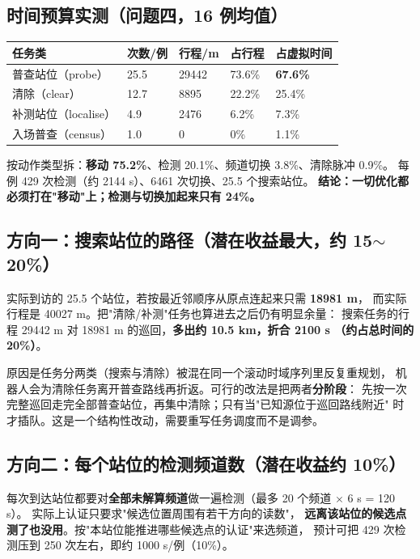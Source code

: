 \subsection{时间预算实测（问题四，16 例均值）}

\begin{center}
\small
\begin{tabular}{p{3.4cm}p{1.8cm}p{2.2cm}p{2.0cm}p{2.4cm}}
\toprule
任务类 & 次数/例 & 行程/m & 占行程 & 占虚拟时间 \\ \midrule
普查站位（probe） & 25.5 & 29442 & 73.6\% & \textbf{67.6\%} \\
清除（clear） & 12.7 & 8895 & 22.2\% & 25.4\% \\
补测站位（localise） & 4.9 & 2476 & 6.2\% & 7.3\% \\
入场普查（census） & 1.0 & 0 & 0\% & 1.1\% \\
\bottomrule
\end{tabular}
\end{center}

按动作类型拆：\textbf{移动 75.2\%}、检测 20.1\%、频道切换 3.8\%、清除脉冲 0.9\%。
每例 429 次检测（约 2144 s）、6461 次切换、25.5 个搜索站位。
\textbf{结论：一切优化都必须打在"移动"上；检测与切换加起来只有 24\%。}

\subsection{方向一：搜索站位的路径（潜在收益最大，约 15$\sim$20\%）}

实际到访的 25.5 个站位，若按最近邻顺序从原点连起来只需 \textbf{18981 m}，
而实际行程是 40027 m。把"清除/补测"任务也算进去之后仍有明显余量：
搜索任务的行程 29442 m 对 18981 m 的巡回，\textbf{多出约 10.5 km，折合 2100 s
（约占总时间的 20\%）}。

原因是任务分两类（搜索与清除）被混在同一个滚动时域序列里反复重规划，
机器人会为清除任务离开普查路线再折返。可行的改法是把两者\textbf{分阶段}：
先按一次完整巡回走完全部普查站位，再集中清除；只有当"已知源位于巡回路线附近"
时才插队。这是一个结构性改动，需要重写任务调度而不是调参。

\subsection{方向二：每个站位的检测频道数（潜在收益约 10\%）}

每次到达站位都要对\textbf{全部未解算频道}做一遍检测（最多 20 个频道 $\times$ 6 s = 120 s）。
实际上认证只要求"候选位置周围有若干方向的读数"，
\textbf{远离该站位的候选点测了也没用}。按"本站位能推进哪些候选点的认证"来选频道，
预计可把 429 次检测压到 250 次左右，即约 1000 s/例（10\%）。

